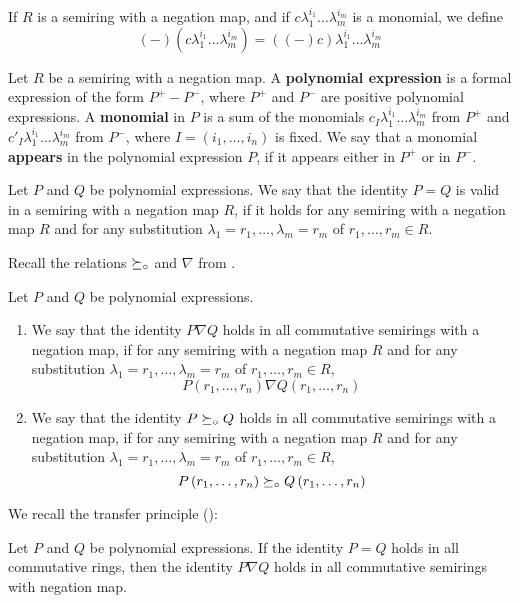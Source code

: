 If $R$ is a semiring with a negation map, and if $c\lambda_1^{i_1}\dots \lambda_m^{i_m}$ is a monomial, we define
$$\left(-\right)\left(c\lambda_1^{i_1}\dots \lambda_m^{i_m}\right)=\left(\left(-\right)c\right)\lambda_1^{i_1}\dots \lambda_m^{i_m}$$

\begin{defn}
Let $R$ be a semiring with a negation map. A \textbf{polynomial expression} is a formal expression of the form $P^+-P^-$, where $P^+$ and $P^-$ are positive polynomial expressions. A \textbf{monomial} in $P$ is a sum of the monomials $c_I\lambda_1^{i_1}\dots \lambda_m^{i_m}$ from $P^+$ and $c'_I\lambda_1^{i_1}\dots \lambda_m^{i_m}$ from $P^-$, where $I=\left(i_1,\dots,i_n\right)$ is fixed. We say that a monomial \textbf{appears} in the polynomial expression $P$, if it appears either in $P^+$ or in $P^-$.
\end{defn}

\begin{defn}
Let $P$ and $Q$ be polynomial expressions. We say that the identity $P=Q$ is valid in a semiring with a negation map $R$, if it holds for any semiring with a negation map $R$ and for any substitution $\lambda_1=r_1,\dots,\lambda_m=r_m$ of $r_1,\dots,r_m\in R$.
\end{defn}

Recall the relations $\succeq_\circ$ and $\nabla$ from .

\begin{defn}
Let $P$ and $Q$ be polynomial expressions.
\begin{enumerate}
\item We say that the identity $P\nabla Q$ holds in all commutative semirings with a negation map, if for any semiring with a negation map $R$ and for any substitution $\lambda_1=r_1,\dots,\lambda_m=r_m$ of $r_1,\dots,r_m\in R$,
    $$P\left(r_1,\dots,r_n\right)\nabla Q\left(r_1,\dots,r_n\right)$$
\item We say that the identity $P\succeq_\circ Q$ holds in all commutative semirings with a negation map, if for any semiring with a negation map $R$ and for any substitution $\lambda_1=r_1,\dots,\lambda_m=r_m$ of $r_1,\dots,r_m\in R$,
    $$P\left(r_1,\dots,r_n\right)\succeq_\circ Q\left(r_1,\dots,r_n\right)$$
\end{enumerate}
\end{defn}

We recall the transfer principle (\cite[Theorems 4.20 and 4.21]{Akian2008}):

\begin{thm}
Let $P$ and $Q$ be polynomial expressions. If the identity $P=Q$ holds in all commutative rings, then the identity $P\nabla Q$ holds in all commutative semirings with negation map.
\end{thm}

